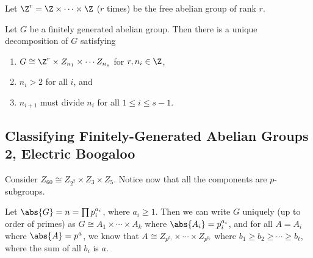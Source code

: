 \begin{definition}
Let $\Z^r = \Z \times \cdots \times \Z$ ($r$ times) be the free abelian group of rank $r$.
\end{definition}

\begin{theorem}
Let $G$ be a finitely generated abelian group. Then there is a unique decomposition of $G$ satisfying
\begin{enumerate}
\item $G \cong \Z^r \times Z_{n_1} \times \cdots Z_{n_s}$ for $r,n_i \in \Z$,
\item $n_i > 2$ for all $i$, and 
\item $n_{i+1}$ must divide $n_i$ for all $1 \leq i \leq s-1$.
\end{enumerate}
\end{theorem}

\subsection{Classifying Finitely-Generated Abelian Groups 2, Electric Boogaloo}

\begin{example}
Consider $Z_{60} \cong Z_{2^2} \times Z_{3} \times Z_{5}$. Notice now that all the components are $p$-subgroups.
\end{example}

\begin{theorem}
Let $\abs{G} = n = \prod p_i^{a_i}$, where $a_i \geq 1$. Then we can write $G$ uniquely (up to order of primes) as $G \cong A_1 \times \cdots \times A_k$ where $\abs{A_i} = p_i^{a_i}$, and for all $A = A_i$ where $\abs{A} = p^a$, we know that $A \cong Z_{p^{b_1}} \times \cdots \times Z_{p^{b_\ell}}$ where $b_1 \geq b_2 \geq \cdots \geq b_\ell$, where the sum of all $b_i$ is $a$.
\end{theorem}
